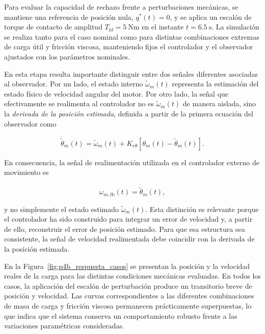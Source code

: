 \documentclass[10pt,a4paper]{article}
\begin{document}
Para evaluar la capacidad de rechazo frente a perturbaciones mecánicas, se
mantiene una referencia de posición nula, $q^{*}(t)=0$, y se aplica un
escalón de torque de contacto de amplitud
$T_{ld}=\SI{5}{\newton\metre}$ en el instante
$t=\SI{6.5}{\second}$. La simulación se realiza tanto para el caso nominal
como para distintas combinaciones extremas de carga útil y fricción
viscosa, manteniendo fijos el controlador y el observador ajustados con
los parámetros nominales.

En esta etapa resulta importante distinguir entre dos señales diferentes
asociadas al observador. Por un lado, el estado interno
$\widetilde{\omega}_m(t)$ representa la estimación del estado físico de
velocidad angular del motor. Por otro lado, la señal que efectivamente se
realimenta al controlador no es $\widetilde{\omega}_m(t)$ de manera
aislada, sino la \emph{derivada de la posición estimada}, definida a
partir de la primera ecuación del observador como

\begin{equation*}
	\dot{\widetilde{\theta}}_m(t)
	=
	\widetilde{\omega}_m(t)
	+
	K_{e\theta}
	\left[
	\theta_m(t)-\widetilde{\theta}_m(t)
	\right].
	\label{eq:theta_est_dot_rechazo}
\end{equation*}

En consecuencia, la señal de realimentación utilizada en el controlador
externo de movimiento es

\begin{equation*}
	\omega_{m,\mathrm{fb}}(t)
	=
	\dot{\widetilde{\theta}}_m(t),
	\label{eq:omega_fb_rechazo}
\end{equation*}

y no simplemente el estado estimado $\widetilde{\omega}_m(t)$. Esta
distinción es relevante porque el controlador ha sido construido para
integrar un error de velocidad y, a partir de ello, reconstruir el error
de posición estimado. Para que esa estructura sea consistente, la señal de
velocidad realimentada debe coincidir con la derivada de la posición
estimada.

En la Figura~\ref{fig:p4b_respuesta_casos} se presentan la posición y la
velocidad reales de la carga para las distintas condiciones mecánicas
evaluadas. En todos los casos, la aplicación del escalón de perturbación
produce un transitorio breve de posición y velocidad. Las curvas
correspondientes a las diferentes combinaciones de masa de carga y
fricción viscosa permanecen prácticamente superpuestas, lo que indica que
el sistema conserva un comportamiento robusto frente a las variaciones
paramétricas consideradas.
\end{document}
